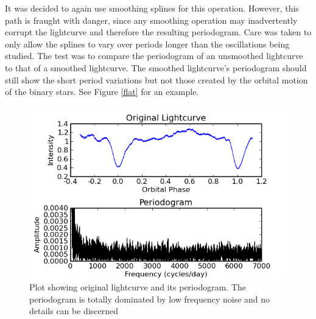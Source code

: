 It was decided to again use smoothing splines for this operation. However, this path is fraught with danger, since any smoothing operation may inadvertently corrupt the lightcurve and therefore the resulting periodogram. Care was taken to only allow the splines to vary over periods longer than the oscillations being studied. The test was to compare the periodogram of an unsmoothed lightcurve to that of a smoothed lightcurve. The smoothed lightcurve's periodogram should still show the short period variations but not those created by the orbital motion of the binary stars. See Figure \ref{flat} for an example.

\begin{figure}
\begin{center}
\includegraphics[width=0.85\columnwidth,bb=0 0 600 400]{images/unflattened.png}
\caption[Original lightcurve and periodogram]{Plot showing original lightcurve and its periodogram. The periodogram is totally dominated by low frequency noise and no details can be discerned}
\label{unflat}
\end{center}
\end{figure}

